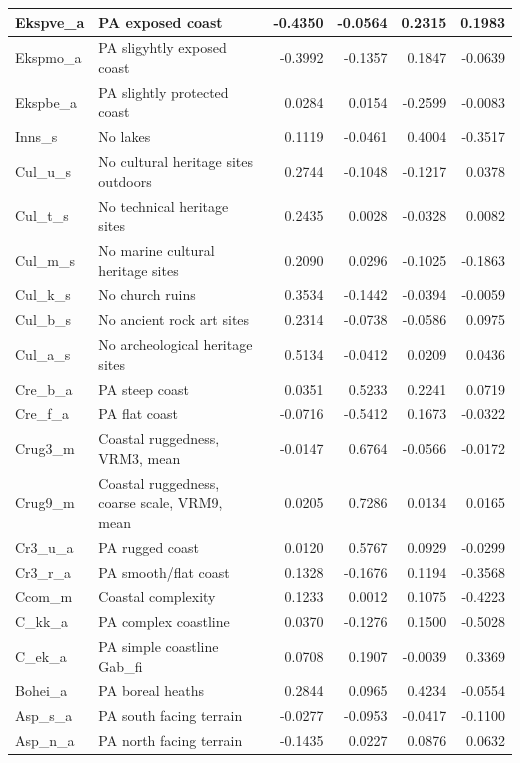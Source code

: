 \documentclass[]{article}
\begin{document}
\begin{table}[H]
\begin{tabular}{l|l|r|r|r|r}
\hline
Ekspve\_a & PA exposed coast & -0.4350 & -0.0564 & 0.2315 & 0.1983\\
\hline
Ekspmo\_a & PA sligyhtly exposed coast & -0.3992 & -0.1357 & 0.1847 & -0.0639\\
\hline
Ekspbe\_a & PA slightly protected coast & 0.0284 & 0.0154 & -0.2599 & -0.0083\\
\hline
Inns\_s & No lakes & 0.1119 & -0.0461 & 0.4004 & -0.3517\\
\hline
Cul\_u\_s & No cultural heritage sites outdoors & 0.2744 & -0.1048 & -0.1217 & 0.0378\\
\hline
Cul\_t\_s & No technical heritage sites & 0.2435 & 0.0028 & -0.0328 & 0.0082\\
\hline
Cul\_m\_s & No marine cultural heritage sites & 0.2090 & 0.0296 & -0.1025 & -0.1863\\
\hline
Cul\_k\_s & No church ruins & 0.3534 & -0.1442 & -0.0394 & -0.0059\\
\hline
Cul\_b\_s & No ancient rock art sites & 0.2314 & -0.0738 & -0.0586 & 0.0975\\
\hline
Cul\_a\_s & No archeological heritage sites & 0.5134 & -0.0412 & 0.0209 & 0.0436\\
\hline
Cre\_b\_a & PA steep coast & 0.0351 & 0.5233 & 0.2241 & 0.0719\\
\hline
Cre\_f\_a & PA flat coast & -0.0716 & -0.5412 & 0.1673 & -0.0322\\
\hline
Crug3\_m & Coastal ruggedness, VRM3, mean & -0.0147 & 0.6764 & -0.0566 & -0.0172\\
\hline
Crug9\_m & Coastal ruggedness, coarse scale, VRM9, mean & 0.0205 & 0.7286 & 0.0134 & 0.0165\\
\hline
Cr3\_u\_a & PA rugged coast & 0.0120 & 0.5767 & 0.0929 & -0.0299\\
\hline
Cr3\_r\_a & PA smooth/flat coast & 0.1328 & -0.1676 & 0.1194 & -0.3568\\
\hline
Ccom\_m & Coastal complexity & 0.1233 & 0.0012 & 0.1075 & -0.4223\\
\hline
C\_kk\_a & PA complex coastline & 0.0370 & -0.1276 & 0.1500 & -0.5028\\
\hline
C\_ek\_a & PA simple coastline Gab\_fi & 0.0708 & 0.1907 & -0.0039 & 0.3369\\
\hline
Bohei\_a & PA boreal heaths & 0.2844 & 0.0965 & 0.4234 & -0.0554\\
\hline
Asp\_s\_a & PA south facing terrain & -0.0277 & -0.0953 & -0.0417 & -0.1100\\
\hline
Asp\_n\_a & PA north facing terrain & -0.1435 & 0.0227 & 0.0876 & 0.0632\\

\end{tabular}
\end{table}
\end{document}
